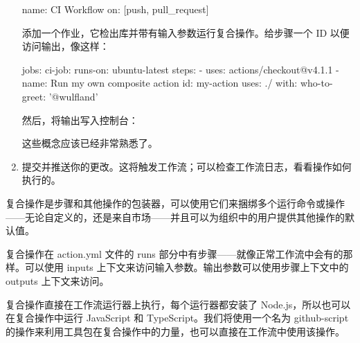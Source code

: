 \begin{enumerate}
\begin{shell}
name: CI Workflow
on: [push, pull_request]
\end{shell}

添加一个作业，它检出库并带有输入参数运行复合操作。给步骤一个 ID 以便访问输出，像这样：

\begin{shell}
jobs:
  ci-job:
    runs-on: ubuntu-latest
    steps:
      - uses: actions/checkout@v4.1.1
      - name: Run my own composite action
        id: my-action
        uses: ./
        with:
          who-to-greet: '@wulfland'
\end{shell}

然后，将输出写入控制台：


这些概念应该已经非常熟悉了。

\item 
提交并推送你的更改。这将触发工作流；可以检查工作流日志，看看操作如何执行的。
\end{enumerate}


复合操作是步骤和其他操作的包装器，可以使用它们来捆绑多个运行命令或操作——无论自定义的，还是来自市场——并且可以为组织中的用户提供其他操作的默认值。

复合操作在 action.yml 文件的 runs 部分中有步骤——就像正常工作流中会有的那样。可以使用 inputs 上下文来访问输入参数。输出参数可以使用步骤上下文中的 outputs 上下文来访问。


复合操作直接在工作流运行器上执行，每个运行器都安装了 Node.js，所以也可以在复合操作中运行 JavaScript 和 TypeScript。我们将使用一个名为 github-script 的操作来利用工具包在复合操作中的力量，也可以直接在工作流中使用该操作。